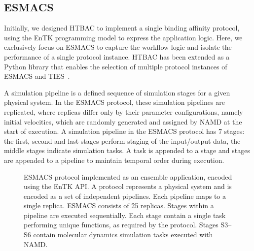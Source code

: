 \subsection{ESMACS}\label{sec:htbac}

Initially, we designed HTBAC to implement a single binding affinity protocol,
using the EnTK programming model to express the application logic. Here, we
exclusively focus on ESMACS to capture the workflow logic and isolate the
performance of a single protocol instance. HTBAC has been extended as a
Python library that enables the selection of multiple protocol instances of
ESMACS and TIES~\cite{dakka}.

A simulation pipeline is a defined sequence of simulation stages for a given
physical system. In the ESMACS protocol, these simulation pipelines are
replicated, where replicas differ only by their parameter configurations,
namely initial velocities, which are randomly generated and assigned by NAMD
at the start of execution. A simulation pipeline in the ESMACS protocol has 7
stages: the first, second and last stages perform staging of the input/output
data, the middle stages indicate simulation tasks. A task is appended to a
stage and stages are appended to a pipeline to maintain temporal order during
execution.


\begin{figure}[h!]
\caption{
  ESMACS protocol implemented as an ensemble application, encoded
  using the EnTK API\@. A protocol represents a physical system and is
  encoded as a set of independent pipelines. Each pipeline maps to a single
  replica. ESMACS consists of 25 replicas. Stages within a pipeline are
  executed sequentially. Each stage contain a single task performing unique
  functions, as required by the protocol. Stages S3--S6 contain molecular
  dynamics simulation tasks executed with NAMD\@. }
  \label{figure:HTBAC}
  \end{figure}



